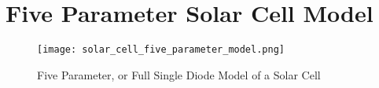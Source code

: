 \section{Five Parameter Solar Cell Model}\label{sec:five_parameter_solar_cell_model}


\begin{figure}[h]
    \texttt{[image: solar\_cell\_five\_parameter\_model.png]}
    \caption{Five Parameter, or Full Single Diode Model of a Solar Cell}
    \label{fig:single_diode_model_with_resistances}
\end{figure}
